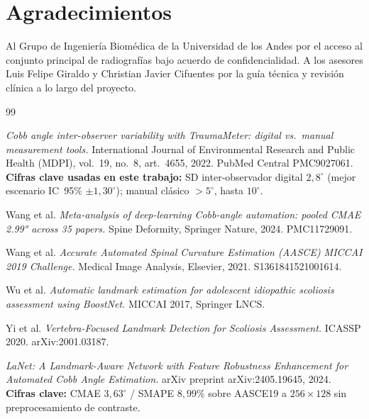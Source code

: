 \documentclass[conference]{IEEEtran}
\begin{document}
\section*{Agradecimientos}
Al Grupo de Ingeniería Biomédica de la Universidad de los Andes por el acceso al conjunto principal de radiografías bajo acuerdo de confidencialidad. A los asesores Luis Felipe Giraldo y Christian Javier Cifuentes por la guía técnica y revisión clínica a lo largo del proyecto.

\balance
\begin{thebibliography}{99}

\emph{Cobb angle inter-observer variability with TraumaMeter: digital vs.\ manual measurement tools.}
International Journal of Environmental Research and Public Health (MDPI), vol.~19, no.~8, art.~4655, 2022. PubMed Central PMC9027061.
\textbf{Cifras clave usadas en este trabajo:} SD inter-observador digital $2{,}8^{\circ}$ (mejor escenario IC~95\% $\pm 1{,}30^{\circ}$); manual clásico $> 5^{\circ}$, hasta $10^{\circ}$.

Wang et al.
\emph{Meta-analysis of deep-learning Cobb-angle automation: pooled CMAE 2.99° across 35 papers.}
Spine Deformity, Springer Nature, 2024. PMC11729091.

Wang et al.
\emph{Accurate Automated Spinal Curvature Estimation (AASCE) MICCAI 2019 Challenge.}
Medical Image Analysis, Elsevier, 2021. S1361841521001614.

Wu et al.
\emph{Automatic landmark estimation for adolescent idiopathic scoliosis assessment using BoostNet.}
MICCAI 2017, Springer LNCS.

Yi et al.
\emph{Vertebra-Focused Landmark Detection for Scoliosis Assessment.}
ICASSP 2020. arXiv:2001.03187.

\emph{LaNet: A Landmark-Aware Network with Feature Robustness Enhancement for Automated Cobb Angle Estimation.}
arXiv preprint arXiv:2405.19645, 2024.
\textbf{Cifras clave:} CMAE $3{,}63^{\circ}$ / SMAPE $8{,}99\%$ sobre AASCE19 a $256{\times}128$ sin preprocesamiento de contraste.


\end{thebibliography}
\end{document}
